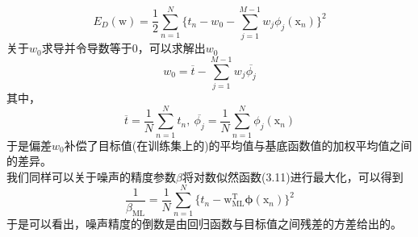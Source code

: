 \documentclass[b5paper]{book}
\numberwithin{equation}{chapter}
\newcommand {\bx} {\boldsymbol{\mathrm{x}}}
\newcommand {\bw} {\boldsymbol{\mathrm{w}}}
\newcommand {\rmT} {\mathrm{T}}
\newcommand {\bfphi} {\boldsymbol{\phi}}
\begin{document}
{	\begin{equation}
		E_D(\bw) = \frac{1}{2}\sum_{n=1}^N \{t_n -w_0 -\sum_{j=1}^{M-1}w_j \phi_j (\bx_n)\}^2
	\end{equation}
	关于$w_0$求导并令导数等于0，可以求解出$w_0$
	\begin{equation}
		w_0=\overline{t}-\sum_{j=1}^{M-1}w_j \overline{\phi_j}
	\end{equation}
	其中，
	\begin{equation}
		\overline{t}= \frac{1}{N}\sum_{n=1}^N t_n, \ \overline{\phi_j}=\frac{1}{N}\sum_{n=1}^N \phi_j(\bx_n)
	\end{equation}
	于是偏差$w_0$补偿了目标值(在训练集上的)的平均值与基底函数值的加权平均值之间的差异。\\
	\indent 我们同样可以关于噪声的精度参数$\beta$将对数似然函数(3.11)进行最大化，可以得到
	\begin{equation}
		\frac{1}{\beta_{\mathrm{ML}}}= \frac{1}{N} \sum_{n=1}^N \{t_n - \bw_{\mathrm{ML}}^{\rmT}\bfphi(\bx_n)\}^2
	\end{equation}
	于是可以看出，噪声精度的倒数是由回归函数与目标值之间残差的方差给出的。
	}
\end{document}
